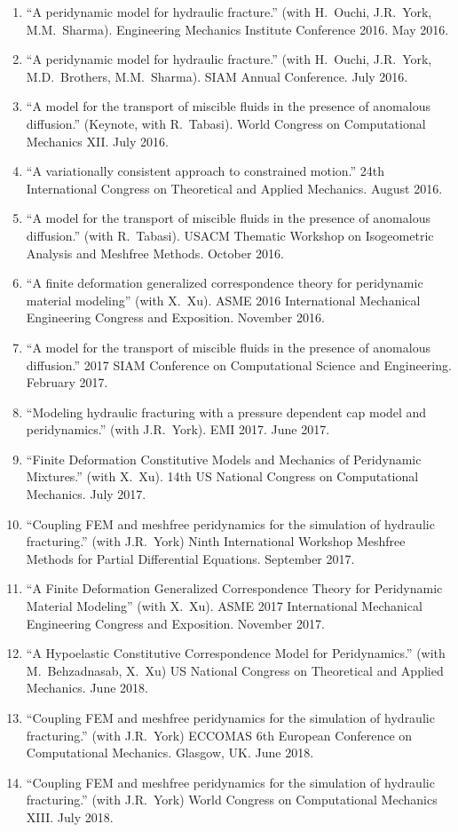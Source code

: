 \begin{enumerate}[resume]
    \item ``A peridynamic model for hydraulic fracture.'' (with H.\ Ouchi, J.R.\ York, M.M.\ Sharma). Engineering Mechanics Institute Conference 2016. May 2016.
    \item ``A peridynamic model for hydraulic fracture.'' (with H.\ Ouchi, J.R.\ York, M.D.\ Brothers, M.M.\ Sharma). SIAM Annual Conference.  July 2016.
    \item ``A model for the transport of miscible fluids in the presence of anomalous diffusion.'' (Keynote, with R.\ Tabasi). World Congress on Computational Mechanics XII.  July 2016.
    \item ``A variationally consistent approach to constrained motion.'' 24th International Congress on Theoretical and Applied Mechanics.  August 2016.
    \item ``A model for the transport of miscible fluids in the presence of anomalous diffusion.'' (with R.\ Tabasi). USACM Thematic Workshop on Isogeometric Analysis and Meshfree Methods.  October 2016.
    \item ``A finite deformation generalized correspondence theory for peridynamic material modeling'' (with X.\ Xu). ASME 2016 International Mechanical Engineering Congress and Exposition. November 2016.
    \item ``A model for the transport of miscible fluids in the presence of anomalous diffusion.'' 2017 SIAM Conference on Computational Science and Engineering.  February 2017.
    \item ``Modeling hydraulic fracturing with a pressure dependent cap model and peridynamics.'' (with J.R.\ York). EMI 2017. June 2017.
    \item ``Finite Deformation Constitutive Models and Mechanics of Peridynamic Mixtures.'' (with X.\ Xu). 14th US National Congress on Computational Mechanics. July 2017.
    \item ``Coupling FEM and meshfree peridynamics for the simulation of hydraulic fracturing.'' (with J.R.\ York) Ninth International Workshop Meshfree Methods for Partial Differential Equations. September 2017.
    \item ``A Finite Deformation Generalized Correspondence Theory for Peridynamic Material Modeling'' (with X.\ Xu). ASME 2017 International Mechanical Engineering Congress and Exposition. November 2017.
    \item ``A Hypoelastic Constitutive Correspondence Model for Peridynamics.'' (with M.\ Behzadnasab, X.\ Xu) US National Congress on Theoretical and Applied Mechanics. June 2018.
    \item ``Coupling FEM and meshfree peridynamics for the simulation of hydraulic fracturing.'' (with J.R.\ York) ECCOMAS 6th European Conference on Computational Mechanics. Glasgow, UK. June 2018.
    \item ``Coupling FEM and meshfree peridynamics for the simulation of hydraulic fracturing.'' (with J.R.\ York) World Congress on Computational Mechanics XIII. July 2018.
\end{enumerate}
